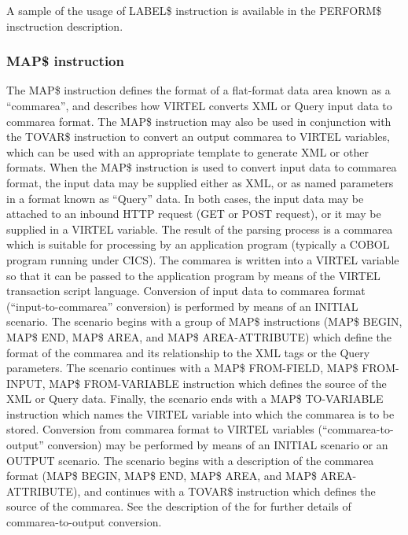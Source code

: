 \documentclass[letterpaper,10pt,english]{sphinxmanual}
\begin{document}
A sample of the usage of LABEL\$ instruction is available in the PERFORM\$ insctruction description.


\subsubsection{MAP\$ instruction}
\label{\detokenize{User_Guide:v457ug-map}}\label{\detokenize{User_Guide:map-instruction}}
The MAP\$ instruction defines the format of a flat-format data area known as a “commarea”, and describes how VIRTEL
converts XML or Query input data to commarea format. The MAP\$ instruction may also be used in conjunction with
the TOVAR\$ instruction to convert an output commarea to VIRTEL variables, which can be used with an appropriate
template to generate XML or other formats.
When the MAP\$ instruction is used to convert input data to commarea format, the input data may be supplied either
as XML, or as named parameters in a format known as “Query” data. In both cases, the input data may be attached to
an inbound HTTP request (GET or POST request), or it may be supplied in a VIRTEL variable. The result of the parsing
process is a commarea which is suitable for processing by an application program (typically a COBOL program running
under CICS). The commarea is written into a VIRTEL variable so that it can be passed to the application program by
means of the VIRTEL transaction script language.
Conversion of input data to commarea format (“input-to-commarea” conversion) is performed by means of an INITIAL
scenario. The scenario begins with a group of MAP\$ instructions (MAP\$ BEGIN, MAP\$ END, MAP\$ AREA, and MAP\$
AREA-ATTRIBUTE) which define the format of the commarea and its relationship to the XML tags or the Query
parameters. The scenario continues with a MAP\$ FROM-FIELD, MAP\$ FROM-INPUT, MAP\$ FROM-VARIABLE instruction
which defines the source of the XML or Query data. Finally, the scenario ends with a MAP\$ TO-VARIABLE instruction
which names the VIRTEL variable into which the commarea is to be stored.
Conversion from commarea format to VIRTEL variables (“commarea-to-output” conversion) may be performed by
means of an INITIAL scenario or an OUTPUT scenario. The scenario begins with a description of the commarea format
(MAP\$ BEGIN, MAP\$ END, MAP\$ AREA, and MAP\$ AREA-ATTRIBUTE), and continues with a TOVAR\$ instruction which
defines the source of the commarea. See the description of the {\hyperref[\detokenize{User_Guide:v457ug-tovar}]{}} for further details of
commarea-to-output conversion.
\end{document}
